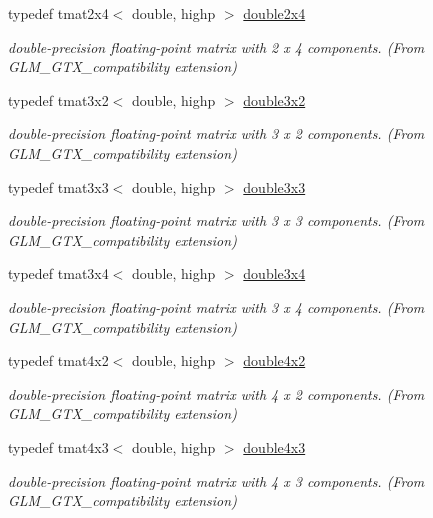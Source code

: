 \begin{DoxyCompactItemize}
typedef tmat2x4$<$ double, highp $>$ \hyperlink{group__gtx__compatibility_gadb90656f5faac0e800718a0a19bf0e03}{double2x4}
\begin{DoxyCompactList}\small\item\em double-\/precision floating-\/point matrix with 2 x 4 components. (From G\+L\+M\+\_\+\+G\+T\+X\+\_\+compatibility extension) \end{DoxyCompactList}\item 
typedef tmat3x2$<$ double, highp $>$ \hyperlink{group__gtx__compatibility_ga00e4b55452fdffa224a68ead4edffa5a}{double3x2}
\begin{DoxyCompactList}\small\item\em double-\/precision floating-\/point matrix with 3 x 2 components. (From G\+L\+M\+\_\+\+G\+T\+X\+\_\+compatibility extension) \end{DoxyCompactList}\item 
typedef tmat3x3$<$ double, highp $>$ \hyperlink{group__gtx__compatibility_ga3bcec888e1dca957b39c2213b740ff21}{double3x3}
\begin{DoxyCompactList}\small\item\em double-\/precision floating-\/point matrix with 3 x 3 components. (From G\+L\+M\+\_\+\+G\+T\+X\+\_\+compatibility extension) \end{DoxyCompactList}\item 
typedef tmat3x4$<$ double, highp $>$ \hyperlink{group__gtx__compatibility_gaa30d4862bab3c5aa40225105a06b62cc}{double3x4}
\begin{DoxyCompactList}\small\item\em double-\/precision floating-\/point matrix with 3 x 4 components. (From G\+L\+M\+\_\+\+G\+T\+X\+\_\+compatibility extension) \end{DoxyCompactList}\item 
typedef tmat4x2$<$ double, highp $>$ \hyperlink{group__gtx__compatibility_ga66ee22fb774d38f1484670c1afa230da}{double4x2}
\begin{DoxyCompactList}\small\item\em double-\/precision floating-\/point matrix with 4 x 2 components. (From G\+L\+M\+\_\+\+G\+T\+X\+\_\+compatibility extension) \end{DoxyCompactList}\item 
typedef tmat4x3$<$ double, highp $>$ \hyperlink{group__gtx__compatibility_gadad0d5da7181385a05567469d4a5dd9a}{double4x3}
\begin{DoxyCompactList}\small\item\em double-\/precision floating-\/point matrix with 4 x 3 components. (From G\+L\+M\+\_\+\+G\+T\+X\+\_\+compatibility extension) \end{DoxyCompactList}\item 

\end{DoxyCompactItemize}
